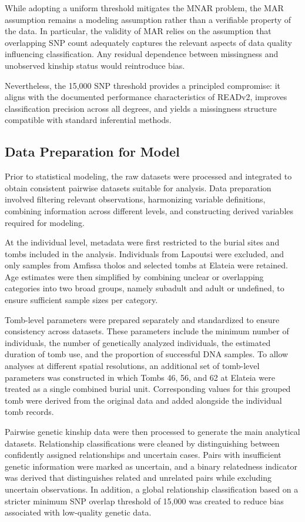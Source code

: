 \documentclass[
]{ajs}
\begin{document}
While adopting a uniform threshold mitigates the MNAR problem, the MAR
assumption remains a modeling assumption rather than a verifiable
property of the data. In particular, the validity of MAR relies on the
assumption that overlapping SNP count adequately captures the relevant
aspects of data quality influencing classification. Any residual
dependence between missingness and unobserved kinship status would
reintroduce bias.

Nevertheless, the 15,000 SNP threshold provides a principled compromise:
it aligns with the documented performance characteristics of READv2,
improves classification precision across all degrees, and yields a
missingness structure compatible with standard inferential methods.

\subsection{Data Preparation for
Model}\label{data-preparation-for-model}

Prior to statistical modeling, the raw datasets were processed and
integrated to obtain consistent pairwise datasets suitable for analysis.
Data preparation involved filtering relevant observations, harmonizing
variable definitions, combining information across different levels, and
constructing derived variables required for modeling.

At the individual level, metadata were first restricted to the burial
sites and tombs included in the analysis. Individuals from Lapoutsi were
excluded, and only samples from Amfissa tholos and selected tombs at
Elateia were retained. Age estimates were then simplified by combining
unclear or overlapping categories into two broad groups, namely subadult
and adult or undefined, to ensure sufficient sample sizes per category.

Tomb-level parameters were prepared separately and standardized to
ensure consistency across datasets. These parameters include the minimum
number of individuals, the number of genetically analyzed individuals,
the estimated duration of tomb use, and the proportion of successful DNA
samples. To allow analyses at different spatial resolutions, an
additional set of tomb-level parameters was constructed in which Tombs
46, 56, and 62 at Elateia were treated as a single combined burial unit.
Corresponding values for this grouped tomb were derived from the
original data and added alongside the individual tomb records.

Pairwise genetic kinship data were then processed to generate the main
analytical datasets. Relationship classifications were cleaned by
distinguishing between confidently assigned relationships and uncertain
cases. Pairs with insufficient genetic information were marked as
uncertain, and a binary relatedness indicator was derived that
distinguishes related and unrelated pairs while excluding uncertain
observations. In addition, a global relationship classification based on
a stricter minimum SNP overlap threshold of 15,000 was created to reduce
bias associated with low-quality genetic data.
\end{document}
